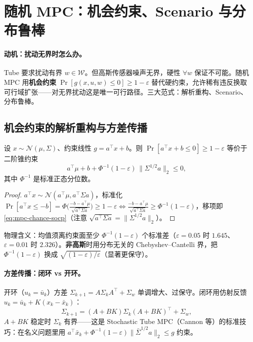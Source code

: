\section{随机 MPC：机会约束、Scenario 与分布鲁棒}
\label{sec:mpc-stochastic}

\paragraph{动机：扰动无界时怎么办。}
Tube 要求扰动有界 $w\in\mathcal W$。但高斯传感器噪声无界，硬性 $\forall w$ 保证不可能。随机 MPC 用\textbf{机会约束} $\Pr[g(x,u,w)\le0]\ge1-\varepsilon$ 替代硬约束，允许稀有违反换取可行域扩张——对无界扰动这是唯一可行路径。三大范式：解析重构、Scenario、分布鲁棒。

\subsection{机会约束的解析重构与方差传播}
\label{sec:mpc-chance}
\begin{theorem}
\label{thm:mpc-chance-socp}
设 $x\sim\mathcal N(\mu,\Sigma)$、约束线性 $g=a^\top x+b$。则 $\Pr[a^\top x+b\le0]\ge1-\varepsilon$ 等价于二阶锥约束
\begin{equation}
  a^\top\mu+b+\Phi^{-1}(1-\varepsilon)\,\|\Sigma^{1/2}a\|_2\le0,
  \label{eq:mpc-chance-socp}
\end{equation}
其中 $\Phi^{-1}$ 是标准正态分位数。
\end{theorem}

\begin{proof}
$a^\top x\sim\mathcal N(a^\top\mu,a^\top\Sigma a)$，标准化 $\Pr[a^\top x\le-b]=\Phi\!\big(\tfrac{-b-a^\top\mu}{\sqrt{a^\top\Sigma a}}\big)\ge1-\varepsilon\iff\tfrac{-b-a^\top\mu}{\sqrt{a^\top\Sigma a}}\ge\Phi^{-1}(1-\varepsilon)$，移项即 \cref{eq:mpc-chance-socp}（注意 $\sqrt{a^\top\Sigma a}=\|\Sigma^{1/2}a\|_2$）。
\end{proof}

\noindent{}物理含义：均值须离约束面至少 $\Phi^{-1}(1-\varepsilon)$ 个标准差（$\varepsilon=0.05$ 时 $1.645$、$\varepsilon=0.01$ 时 $2.326$）。\textbf{非高斯}时用分布无关的 Chebyshev--Cantelli 界，把 $\Phi^{-1}(1-\varepsilon)$ 换成 $\sqrt{(1-\varepsilon)/\varepsilon}$（显著更保守）。

\paragraph{方差传播：闭环 vs 开环。}
开环（$u_k=\bar u_k$）方差 $\Sigma_{k+1}=A\Sigma_kA^\top+\Sigma_w$ 单调增大、过保守。闭环用仿射反馈 $u_k=\bar u_k+K(x_k-\bar x_k)$：
\begin{equation}
  \Sigma_{k+1}=(A+BK)\Sigma_k(A+BK)^\top+\Sigma_w,
  \label{eq:mpc-var-prop}
\end{equation}
$A+BK$ 稳定时 $\Sigma_k$ 有界——这是 Stochastic Tube MPC（Cannon 等）的标准技巧：在名义问题里用 $a^\top\bar x_k+\Phi^{-1}(1-\varepsilon)\|\bar\Sigma^{1/2}a\|_2\le g$ 约束。

